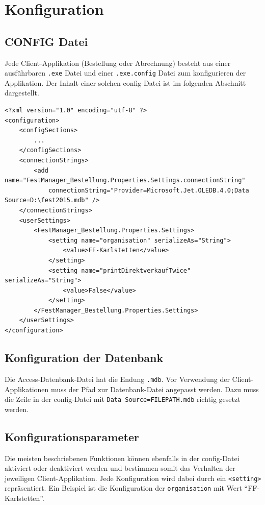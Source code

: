 \documentclass[
10pt, %
a4paper, %
oneside, %
headinclude,footinclude, %
BCOR5mm, %
]{scrartcl}
\theoremstyle{definition} %
\theoremstyle{plain} %
\theoremstyle{remark} %
\begin{document}
\newpage
\section{Konfiguration}

\subsection{CONFIG Datei}
Jede Client-Applikation (Bestellung oder Abrechnung) besteht aus einer ausführbaren \texttt{.exe} Datei und einer \texttt{.exe.config} Datei zum konfigurieren der Applikation. Der Inhalt einer solchen config-Datei ist im folgenden Abschnitt dargestellt.

\begin{lstlisting}
<?xml version="1.0" encoding="utf-8" ?>
<configuration>
    <configSections>
        ...
    </configSections>
    <connectionStrings>
        <add name="FestManager_Bestellung.Properties.Settings.connectionString"
            connectionString="Provider=Microsoft.Jet.OLEDB.4.0;Data Source=D:\fest2015.mdb" />
    </connectionStrings>
    <userSettings>
        <FestManager_Bestellung.Properties.Settings>
            <setting name="organisation" serializeAs="String">
                <value>FF-Karlstetten</value>
            </setting>
            <setting name="printDirektverkaufTwice" serializeAs="String">
                <value>False</value>
            </setting>
        </FestManager_Bestellung.Properties.Settings>
    </userSettings>
</configuration>
\end{lstlisting}

\subsection{Konfiguration der Datenbank}
Die Access-Datenbank-Datei hat die Endung \texttt{.mdb}. Vor Verwendung der Client-Applikationen muss der Pfad zur Datenbank-Datei angepasst werden. Dazu muss die Zeile in der config-Datei mit \texttt{Data Source=FILEPATH.mdb} richtig gesetzt werden.

\subsection{Konfigurationsparameter}
Die meisten beschriebenen Funktionen können ebenfalls in der config-Datei aktiviert oder deaktiviert werden und bestimmen somit das Verhalten der jeweiligen Client-Applikation. Jede Konfiguration wird dabei durch ein \texttt{<setting>} repräsentiert. Ein Beispiel ist die Konfiguration der \texttt{organisation} mit Wert "`FF-Karlstetten"'. 
\end{document}
